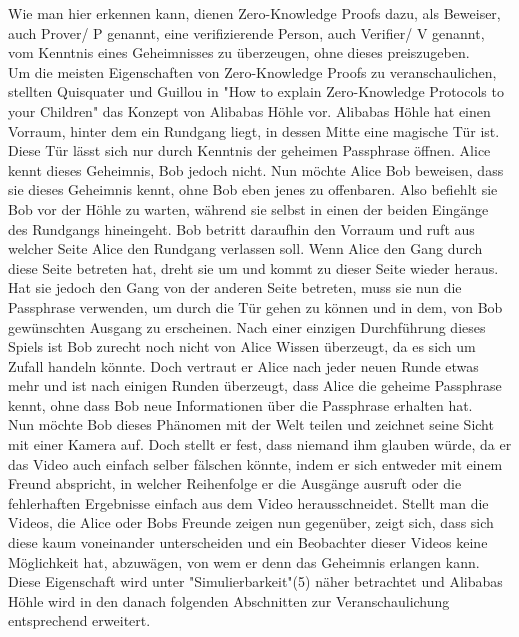 \documentclass {article}
\begin{document}
Wie man hier erkennen kann, dienen Zero-Knowledge Proofs dazu, als Beweiser, auch Prover/ P genannt, eine
verifizierende Person, auch Verifier/ V genannt, vom Kenntnis eines Geheimnisses zu überzeugen, ohne dieses preiszugeben. \\ 

Um die meisten Eigenschaften von Zero-Knowledge Proofs zu veranschaulichen, stellten Quisquater und Guillou in "How to explain Zero-Knowledge Protocols to your Children"\cite{GQ89} das Konzept von Alibabas H\"ohle vor.
Alibabas H\"ohle hat einen Vorraum, hinter dem ein Rundgang liegt, in dessen Mitte eine magische T\"ur ist. Diese T\"ur l\"asst sich nur durch Kenntnis der geheimen Passphrase \"offnen.
Alice kennt dieses Geheimnis, Bob jedoch nicht.
Nun m\"ochte Alice Bob beweisen, dass sie dieses Geheimnis kennt, ohne Bob eben jenes zu offenbaren. Also befiehlt sie Bob vor der H\"ohle zu warten, w\"ahrend sie selbst in einen der beiden Eing\"ange des Rundgangs hineingeht. Bob betritt daraufhin den Vorraum und ruft aus welcher Seite Alice den Rundgang verlassen soll. Wenn Alice den Gang durch diese Seite betreten hat, dreht sie um und kommt zu dieser Seite wieder heraus. Hat sie jedoch den Gang von der anderen Seite betreten, muss sie nun die Passphrase verwenden, um durch die T\"ur gehen zu k\"onnen und in dem, von Bob gewünschten Ausgang zu erscheinen. Nach einer einzigen Durchf\"uhrung dieses Spiels ist Bob zurecht noch nicht von Alice Wissen \"uberzeugt, da es sich um Zufall handeln k\"onnte. Doch vertraut er Alice nach jeder neuen Runde etwas mehr und ist nach einigen Runden \"uberzeugt, dass Alice die geheime Passphrase kennt, ohne dass Bob neue Informationen \"uber die Passphrase erhalten hat. \\  Nun m\"ochte Bob dieses Ph\"anomen mit der Welt teilen und zeichnet seine Sicht mit einer Kamera auf. Doch stellt er fest, dass niemand ihm glauben würde, da er das Video auch einfach selber f\"alschen k\"onnte, indem er sich entweder mit einem Freund abspricht, in welcher Reihenfolge er die Ausg\"ange ausruft oder die fehlerhaften Ergebnisse einfach aus dem Video herausschneidet. 
Stellt man die Videos, die Alice oder Bobs Freunde zeigen nun gegen\"uber, zeigt sich, dass sich diese kaum voneinander unterscheiden und ein Beobachter dieser Videos keine M\"oglichkeit hat, abzuw\"agen, von wem er denn das Geheimnis erlangen kann.
Diese Eigenschaft wird unter "Simulierbarkeit"(5) n\"aher betrachtet und Alibabas H\"ohle wird in den danach folgenden Abschnitten zur Veranschaulichung entsprechend erweitert.
\end{document}

